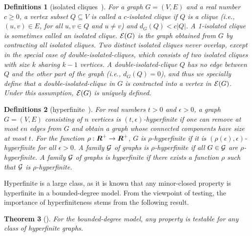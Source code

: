 \documentclass[11pt]{article}
\newtheorem{thm}{Theorem}[section]
\newtheorem{df}[thm]{Definitions}
\begin{document}
\begin{df}[isolated cliques~\cite{IsoClique_TALG09}]
For a graph $G = (V,E)$ and a real number $c \geq 0$, 
a vertex subset $Q \subseteq V$ is called a {\em $c$-isolated clique} 
if $Q$ is a clique (i.e., 
$(u,v) \in E$, for all $u,v \in Q$ and $u \neq v$) 
and $d_G(Q) < c |Q|$. 
A 1-isolated clique is sometimes called an {\em isolated clique}.
${\cal E}(G)$ is the graph obtained from $G$ by contracting all isolated cliques. 
Two distinct isolated cliques never overlap, 
except in the special case of {\em double-isolated-cliques}, which consists 
of two isolated cliques with size $k$ sharing $k-1$ vertices.  
A double-isolated-clique $Q$ has no edge between $Q$ and the 
other part of the graph (i.e., $d_G(Q)=0$), and thus we specially define that a double-isolated-clique in $G$ is contracted into  
a vertex in ${\cal E}(G)$. 
Under this assumption, ${\cal E}(G)$ is uniquely defined. 
\end{df}













\begin{df}[hyperfinite~\cite{hyperfinite}]
For real numbers $t >0$ and $\epsilon >0$, 
a graph $G=(V,E)$ consisting of $n$ vertices is {\em $(t,\epsilon)$-hyperfinite} 
if one can remove at most $\epsilon n$ edges from $G$ 
and obtain a graph whose connected components have size at most $t$. 
For the function $\rho: \mbox{\boldmath$R$}^+ \to \mbox{\boldmath$R$}^+$, 
$G$ is {\em $\rho$-hyperfinite} 
if it is $(\rho(\epsilon),\epsilon)$-hyperfinite for all $\epsilon >0$. 
A family ${\cal G}$ of graphs is {\em $\rho$-hyperfinite}  
if all $G \in {\cal G}$ are $\rho$-hyperfinite. 
A family ${\cal G}$ of graphs is {\em hyperfinite} 
if there exists a function $\rho$ such that ${\cal G}$ is $\rho$-hyperfinite. 
\end{df}

Hyperfinite is a large class, as it is known that any minor-closed property is hyperfinite
in a bounded-degree model. From the viewpoint of testing, the importance of hyperfiniteness stems from the following result. 



\begin{thm}[\cite{NS_Testable_SJCOMP13}]
For the bounded-degree model, any property is testable for any class of hyperfinite graphs. 
\end{thm}
\end{document}
